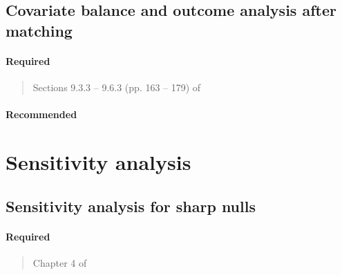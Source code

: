 \documentclass[12pt]{article}
\begin{document}
\begin{verse}
\end{verse}

\subsection{Covariate balance and outcome analysis after matching}

\paragraph*{Required}

\begin{verse}
\end{verse}

\begin{verse}
  Sections 9.3.3 -- 9.6.3 (pp. 163 -- 179) of 
\end{verse}
\newpage
\paragraph*{Recommended}

\begin{verse}
\end{verse}

\begin{verse}
\end{verse}

\section{Sensitivity analysis}

\subsection{Sensitivity analysis for sharp nulls}

\paragraph*{Required}

\begin{verse} Chapter 4 of  \end{verse}

\begin{verse}  \end{verse}
\end{document}
